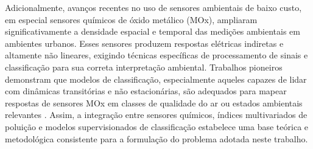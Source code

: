Adicionalmente, avanços recentes no uso de sensores ambientais de baixo custo, em especial sensores químicos de óxido metálico (MOx), ampliaram significativamente a densidade espacial e temporal das medições ambientais em ambientes urbanos. Esses sensores produzem respostas elétricas indiretas e altamente não lineares, exigindo técnicas específicas de processamento de sinais e classificação para sua correta interpretação ambiental. Trabalhos pioneiros demonstram que modelos de classificação, especialmente aqueles capazes de lidar com dinâmicas transitórias e não estacionárias, são adequados para mapear respostas de sensores MOx em classes de qualidade do ar ou estados ambientais relevantes \cite{Menzel2000}. Assim, a integração entre sensores químicos, índices multivariados de poluição e modelos supervisionados de classificação estabelece uma base teórica e metodológica consistente para a formulação do problema adotada neste trabalho.
